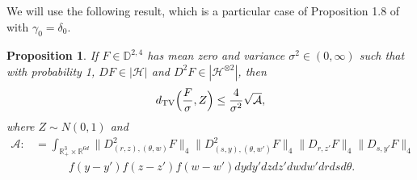 \documentclass[12pt]{article}
\newtheorem{proposition}[theorem]{Proposition}
\def\cH{\mathcal{H}}
\def\bR{\mathbb{R}}
\begin{document}
We will use the following result, which is a particular case of Proposition 1.8 of \cite{BNQZ} with $\gamma_0=\delta_0$.

\begin{proposition}
\label{prop18}
   If $F\in\mathbb{D}^{2,4}$  has mean zero and variance $\sigma^2\in(0,\infty)$ such that with probability 1,  $DF\in| \cH|$ and $D^2F\in|\cH^{\otimes 2}|$, then
\[
d_{\rm TV}\Big( \frac{F}{\sigma},  Z\Big) \leq \frac{4}{\sigma^2} \sqrt{\mathcal{A}},
\]
where $Z\sim N(0,1)$ and
\begin{align*}
\mathcal{A}:&= \int_{\bR_+^3\times\bR^{6d}} \| D_{(r,z),(\theta,w)}^2 F \|_4  \| D_{(s,y),(\theta,w')}^2 F \|_4  \| D_{r,z'}F\|_4 \| D_{s, y' }F \|_4  \\
&\quad  \quad \quad f(y-y')f(z-z') f(w-w')  dydy'dzdz' dwdw'  dr ds d\theta.
\end{align*}
\end{proposition}

\bigskip
\end{document}
